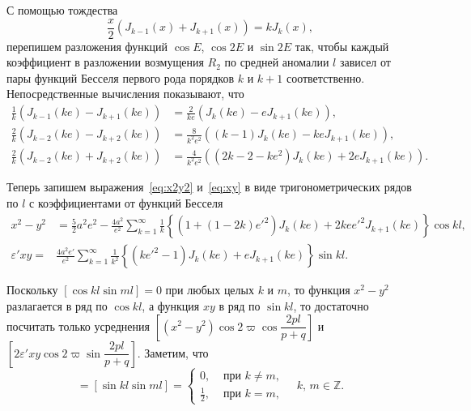 \documentclass[14pt,a4paper%
]{extarticle}
\begin{document}
С помощью тождества 
\begin{equation}\label{eq:Jequality}
 \frac{x}{2}\left(J_{k-1}(x)+J_{k+1}(x)\right)=kJ_k(x),
\end{equation}
перепишем разложения функций $\cos E$, $\cos 2E$ и $\sin 2E$ так, чтобы каждый коэффициент в разложении возмущения $R_2$ по средней аномалии $l$ зависел от пары функций Бесселя первого рода порядков $k$ и $k+1$ соответственно.
Непосредственные вычисления показывают, что
\begin{equation}
\begin{aligned}
\frac{1}{k}\left(J_{k-1}(ke)-J_{k+1}(ke)\right)&=\frac2{ke}\left(J_k(ke)-eJ_{k+1}(ke)\right),\\
\frac{2}{k}\left(J_{k-2}(ke)-J_{k+2}(ke)\right)&=\frac8{k^2e^2}\left((k-1)J_k(ke)-keJ_{k+1}(ke)\right),\\	
\frac{2}{k}\left(J_{k-2}(ke)+J_{k+2}(ke)\right)&=\frac{4}{k^2e^2}\left((2k-2-ke^2)J_k(ke)+2eJ_{k+1}(ke)\right).
\end{aligned}  
\end{equation}


Теперь запишем выражения~\eqref{eq:x2y2} и~\eqref{eq:xy} в виде тригонометрических рядов по $l$ с коэффициентами от функций Бесселя 
\begin{align}
x^2-y^2&=\frac52a^2e^2-\frac{4a^2}{e^2}\sum_{k=1}^\infty\frac1k\left\{\left(1+(1-2k){e'}^2\right)J_k(ke)+2ke {e'}^2J_{k+1}(ke)\right\}\cos kl
,\label{eq:x2y2l}\\
\varepsilon' xy=&\frac{4a^2{e'}}{e^2}\sum_{k=1}^\infty\frac1{k^2}\left\{\left(k{e'}^2-1\right)J_k(ke)+eJ_{k+1}(ke)\right\}\sin kl.\label{eq:xyl}
\end{align}

Поскольку $[\cos kl\sin ml]=0$ при любых целых $k$ и $m$,  то функция $x^2-y^2$ разлагается в ряд по $\cos kl$,  а функция $xy$ в ряд по $\sin kl$, то достаточно посчитать только усреднения  $\left[\left(x^2-y^2\right)\cos2\varpi\cos\dfrac{2pl}{p+q}\right]$ и $\left[2\varepsilon'xy\cos2\varpi\sin\dfrac{2pl}{p+q}\right]$. Заметим, что
\begin{equation}
[\cos kl\cos ml]=[\sin kl\sin ml]=\left\{
\begin{aligned}
0,&\text{ при } k\neq m,\\
\frac12,&\text{ при } k=m,
\end{aligned}
\right.\quad k,\,m\in\mathbb Z.
\end{equation}
\end{document}
